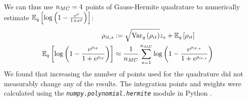 \documentclass{article}\usepackage[]{graphicx}\usepackage[]{color}
\theoremstyle{definition}
\theoremstyle{plain}
\theoremstyle{plain}
\theoremstyle{plain}
\theoremstyle{definition}
\theoremstyle{plain}
\theoremstyle{plain}
\begin{document}
We can thus use $n_{MC}=4$ points of Gauss-Hermite
quadrature to numerically estimate
$\mathbb{E}_{q}\left[\log\left(1-\frac{e^{\rho}}{1+e^{\rho}}\right)\right]$:
\begin{align*}
\rho_{it,s} & :=\sqrt{\textrm{Var}_{q}\left(\rho_{it}\right)}z_{s}+
    \mathbb{E}_{q}\left[\rho_{it}\right]\\
\mathbb{E}_{q}\left[\log\left(1-\frac{e^{\rho_{it}}}{1+e^{\rho_{it}}}\right)\right] &
    \approx\frac{1}{n_{MC}}\sum_{s=1}^{n_{MC}}
    \log\left(1-\frac{e^{\rho_{it,s}}}{1+e^{\rho_{it,s}}}\right)
\end{align*}
We found that increasing the number of points used for the quadrature
did not measurably change any of the results. The integration points
and weights were calculated using the \texttt{\textit{numpy.polynomial.hermite}}
module in Python \citep{scipy}.
 
\clearpage{}



\end{document}
